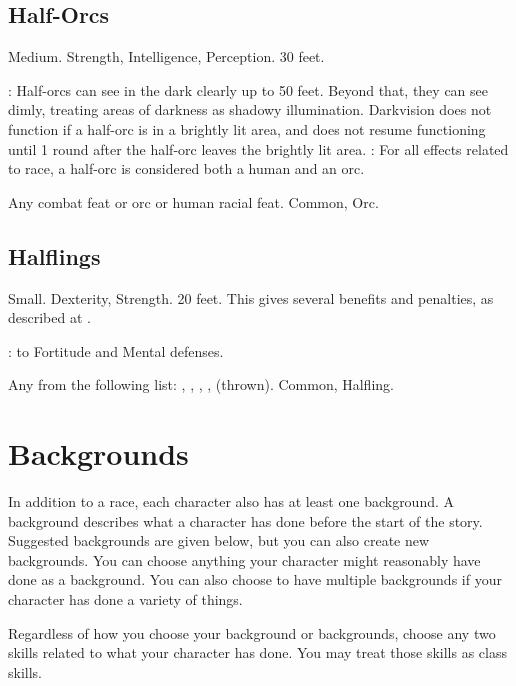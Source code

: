 \subsection{Half-Orcs}
 Medium.
  Strength,  Intelligence,  Perception.
 30 feet.
\begin{itemize}
    : Half-orcs can see in the dark clearly up to 50 feet.   Beyond that, they can see dimly, treating areas of darkness as shadowy illumination. Darkvision does not function if a half-orc is in a brightly lit area, and does not resume functioning until 1 round after the half-orc leaves the brightly lit area.
    : For all effects related to race, a half-orc is considered both a human and an orc.
\end{itemize}
 Any combat feat or orc or human racial feat.
 Common, Orc.

\subsection{Halflings}
 Small.
  Dexterity,  Strength.
 20 feet. This gives several benefits and penalties, as described at .
\begin{itemize}
    :  to Fortitude and Mental defenses.
\end{itemize}
 Any from the following list: , , , ,  (thrown).
 Common, Halfling.

\section{Backgrounds}
In addition to a race, each character also has at least one background. A background describes what a character has done before the start of the story. Suggested backgrounds are given below, but you can also create new backgrounds. You can choose anything your character might reasonably have done as a background. You can also choose to have multiple backgrounds if your character has done a variety of things.

Regardless of how you choose your background or backgrounds, choose any two skills related to what your character has done. You may treat those skills as class skills.

